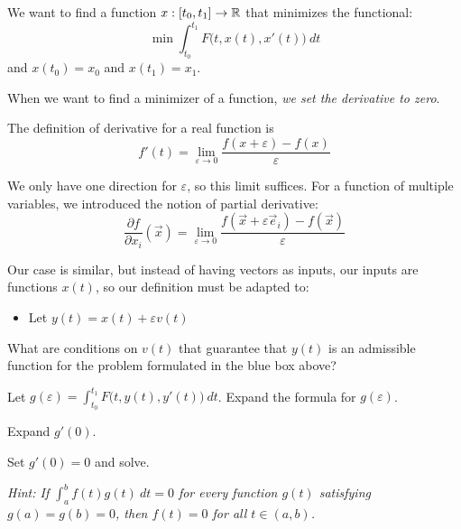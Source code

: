 \documentclass{workbook}
\begin{document}
\begin{slide}
\question

\begin{problem}

We want to find a function $x: [t_0,t_1] \to \mathbb{R}$ that minimizes the functional:
\[ \min \int_{t_0}^{t_1} F \big(t, x(t), x'(t) \big) ~dt \]
and $x(t_0)=x_0$ and $x(t_1)=x_1$.
\end{problem}

When we want to find a minimizer of a function, \textsl{we set the derivative to zero}.



\begin{parts}
	\item The definition of derivative for a real function is
	\[ f'(t) = \lim_{\varepsilon \to 0} \frac{f(x+\varepsilon)-f(x)}{\varepsilon} \]
	
	We only have one direction for $\varepsilon$, so this limit suffices. For a function of multiple variables, we introduced the notion of partial derivative:
	\[ \frac{\partial f}{\partial x_i}(\vec{x}) = \lim_{\varepsilon \to 0} \frac{f(\vec{x}+\varepsilon \vec{e}_i)-f(\vec{x})}{\varepsilon} \]
	
	Our case is similar, but instead of having vectors as inputs, our inputs are functions $x(t)$, so our definition must be adapted to:
	\begin{itemize}
		\item Let $y(t) = x(t) + \varepsilon v(t)$
	\end{itemize}	
	
	What are conditions on $v(t)$ that guarantee that $y(t)$ is an admissible function for the problem formulated in the blue box above?
	
	\item Let $\displaystyle g(\varepsilon) = \int_{t_0}^{t_1} F\big( t, y(t), y'(t) \big) ~dt$. Expand the formula for $g(\varepsilon)$.

	\item Expand $g'(0)$.

	\item Set $g'(0)=0$ and solve.
	
	\textit{Hint: If $\int_a^b f(t) g(t) ~dt=0$ for every function $g(t)$ satisfying $g(a)=g(b)=0$, then $f(t)=0$ for all $t \in (a,b)$.}

\end{parts}
\end{slide}
\end{document}
